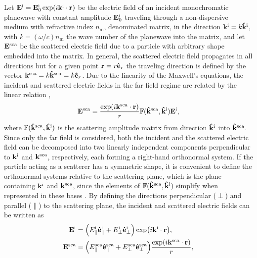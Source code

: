 
Let $\vb{E}^\text{i} = \vb{E}^\text{i}_0 \exp(i\vb{k}^\text{i}\cdot\vb{r})$ be the electric field of an incident monochromatic planewave with constant amplitude $\vb{E}_0^\text{i}$  traveling through a non-dispersive medium with refractive index $n_\text{m}$, denominated matrix, in the direction $\vb{k}^\text{i} = k\vu{k}^\text{i}$, with $k = (\omega/c)n_\text{m}$ the wave number of the planewave into the matrix, and let $\vb{E}^\text{sca}$ be the scattered electric field due to a particle with arbitrary shape embedded into the matrix. In general, the scattered electric field propagates in all directions but for a given point $\vb{r} = r\vu{e}_r$ the traveling direction is defined by the vector $\vb{k}^\text{sca} = k\vu{k}^\text{sca} = k\vu{e}_r$.  Due to the linearity of the Maxwell's equations,   the incident and scattered electric fields  in the far field regime are related by the linear relation \cite{tsang_scattering_2000},
%
 \begin{equation}
	\vb{E}^\text{sca} =   \frac{\exp(i\vb{k}^\text{sca}\cdot\vb{r})}{r} \mathbb{F}(\vu{k}^\text{sca}, \vu{k}^\text{i}) \vb{E}^\text{i},
 \label{eq:ScatAmpMat}
 \end{equation}
%
where $\mathbb{F}(\vu{k}^\text{sca}, \vu{k}^\text{i})$ is the scattering  amplitude matrix from direction $\vu{k}^\text{i}$ into $\vu{k}^\text{sca}$. Since only the far field is considered, both the incident and the scattered electric field can be decomposed into two linearly independent components perpendicular to $\vb{k}^\text{i}$ and $\vb{k}^\text{sca}$, respectively, each forming a right-hand orthonormal system. If the particle acting as a scatterer has a symmetric shape, it is convenient to define the orthonormal systems relative to the scattering plane, which is the plane containing $\vb{k}^\text{i}$ and $\vb{k}^\text{sca}$, since the elements of $\mathbb{F}(\vu{k}^\text{sca}, \vu{k}^\text{i})$ simplify when represented in these bases \cite{tsang_scattering_2000}. By defining the directions perpendicular  ($\perp$) and parallel ($\parallel$) to the scattering plane, the incident and scattered electric fields can be written as
%
 \begin{align}
	\vb{E}^\text{i} & =  \qty(E_\parallel^\text{i}\vu{e}^\text{i}_\parallel + E_\perp^\text{i} \vu{e}_\perp^\text{i}) \exp(i\vb{k}^\text{i}\cdot\vb{r}),
 \label{eq:Ei} \\
	\vb{E}^\text{sca} & = \qty(E_\parallel^\text{sca}\vu{e}^\text{sca}_\parallel + E_\perp^\text{sca} \vu{e}_\perp^\text{sca}) \frac{\exp(i\vb{k}^\text{sca}\cdot\vb{r})}{r},
 \label{eq:Es}
 \end{align}

